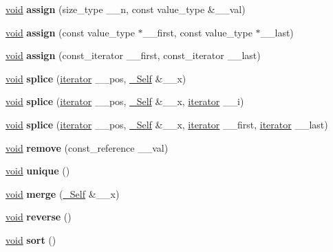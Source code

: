 \begin{DoxyCompactItemize}
\hyperlink{interfacevoid}{void} {\bfseries assign} (size\+\_\+type \+\_\+\+\_\+n, const value\+\_\+type \&\+\_\+\+\_\+val)
\item 
\mbox{\label{classlist_a7cfe9eca3b11f8ec784634b22d007621}} 
\hyperlink{interfacevoid}{void} {\bfseries assign} (const value\+\_\+type $\ast$\+\_\+\+\_\+first, const value\+\_\+type $\ast$\+\_\+\+\_\+last)
\item 
\mbox{\label{classlist_a5ef4b36f9c2ba5fe83cd720e93843b33}} 
\hyperlink{interfacevoid}{void} {\bfseries assign} (const\+\_\+iterator \+\_\+\+\_\+first, const\+\_\+iterator \+\_\+\+\_\+last)
\item 
\mbox{\label{classlist_a2de990150f9cc3b23a52b7d2f9c1712e}} 
\hyperlink{interfacevoid}{void} {\bfseries splice} (\hyperlink{structiterator}{iterator} \+\_\+\+\_\+pos, \hyperlink{classlist}{\+\_\+\+Self} \&\+\_\+\+\_\+x)
\item 
\mbox{\label{classlist_ac096572e90410b2cd1e6b53b6b21eb9a}} 
\hyperlink{interfacevoid}{void} {\bfseries splice} (\hyperlink{structiterator}{iterator} \+\_\+\+\_\+pos, \hyperlink{classlist}{\+\_\+\+Self} \&\+\_\+\+\_\+x, \hyperlink{structiterator}{iterator} \+\_\+\+\_\+i)
\item 
\mbox{\label{classlist_aeb47b5a92f0f20e60a968413fb6a5c3b}} 
\hyperlink{interfacevoid}{void} {\bfseries splice} (\hyperlink{structiterator}{iterator} \+\_\+\+\_\+pos, \hyperlink{classlist}{\+\_\+\+Self} \&\+\_\+\+\_\+x, \hyperlink{structiterator}{iterator} \+\_\+\+\_\+first, \hyperlink{structiterator}{iterator} \+\_\+\+\_\+last)
\item 
\mbox{\label{classlist_a52484ae31cdb4dd26edb20940b7fbde0}} 
\hyperlink{interfacevoid}{void} {\bfseries remove} (const\+\_\+reference \+\_\+\+\_\+val)
\item 
\mbox{\label{classlist_a092e93c572cc4e13b73ca0211fdcff49}} 
\hyperlink{interfacevoid}{void} {\bfseries unique} ()
\item 
\mbox{\label{classlist_a3517ca7c839747061d80808313633dc2}} 
\hyperlink{interfacevoid}{void} {\bfseries merge} (\hyperlink{classlist}{\+\_\+\+Self} \&\+\_\+\+\_\+x)
\item 
\mbox{\label{classlist_a802b55ccb93d228ee7034a7e0ac10df4}} 
\hyperlink{interfacevoid}{void} {\bfseries reverse} ()
\item 
\mbox{\label{classlist_a881d5763b24c96c18cc0e3087700575a}} 
\hyperlink{interfacevoid}{void} {\bfseries sort} ()
\end{DoxyCompactItemize}
